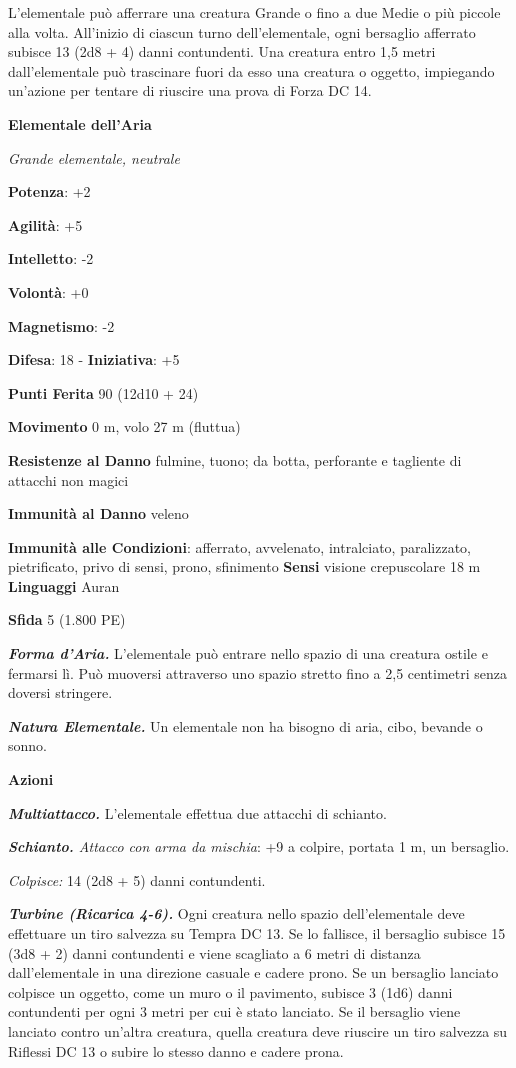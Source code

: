 \begin{multicols}{2}
L'elementale può afferrare una creatura Grande o fino a due Medie o più
piccole alla volta. All'inizio di ciascun turno dell'elementale, ogni
bersaglio afferrato subisce 13 (2d8 + 4) danni contundenti. Una creatura
entro 1,5 metri dall'elementale può trascinare fuori da esso una
creatura o oggetto, impiegando un'azione per tentare di riuscire una
prova di Forza DC 14.



\textbf{Elementale dell'Aria}

\emph{Grande elementale, neutrale}

\textbf{Potenza}: +2

\textbf{Agilità}: +5

\textbf{Intelletto}: -2

\textbf{Volontà}: +0

\textbf{Magnetismo}: -2

\textbf{Difesa}: 18 - \textbf{Iniziativa}: +5

\textbf{Punti Ferita} 90 (12d10 + 24)

\textbf{Movimento} 0 m, volo 27 m (fluttua)

\textbf{Resistenze al Danno} fulmine, tuono; da botta, perforante e
tagliente di attacchi non magici

\textbf{Immunità al Danno} veleno

\textbf{Immunità alle Condizioni}: afferrato, avvelenato, intralciato,
paralizzato, pietrificato, privo di sensi, prono, sfinimento
\textbf{Sensi} visione crepuscolare 18 m
\textbf{Linguaggi} Auran

\textbf{Sfida} 5 (1.800 PE)\smallskip

\emph{\textbf{Forma d'Aria.}} L'elementale può entrare nello spazio di
una creatura ostile e fermarsi lì. Può muoversi attraverso uno spazio
stretto fino a 2,5 centimetri senza doversi stringere.

\emph{\textbf{Natura Elementale.}} Un elementale non ha bisogno di aria,
cibo, bevande o sonno.

\smallskip\textbf{Azioni}

\emph{\textbf{Multiattacco.}} L'elementale effettua due attacchi di
schianto.

\emph{\textbf{Schianto.} Attacco con arma da mischia}: +9 a colpire,
portata 1 m, un bersaglio.

\emph{Colpisce:} 14 (2d8 + 5) danni contundenti.

\emph{\textbf{Turbine (Ricarica 4-6).}} Ogni creatura nello spazio
dell'elementale deve effettuare un tiro salvezza su Tempra DC 13. Se lo
fallisce, il bersaglio subisce 15 (3d8 + 2) danni contundenti e viene
scagliato a 6 metri di distanza dall'elementale in una direzione casuale
e cadere prono. Se un bersaglio lanciato colpisce un oggetto, come un
muro o il pavimento, subisce 3 (1d6) danni contundenti per ogni 3 metri
per cui è stato lanciato. Se il bersaglio viene lanciato contro un'altra
creatura, quella creatura deve riuscire un tiro salvezza su Riflessi DC
13 o subire lo stesso danno e cadere prona.


\end{multicols}
